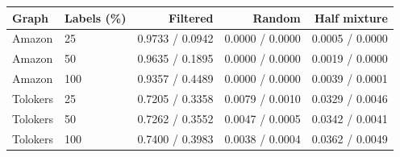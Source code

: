 \begin{tabular}{llrrr}\toprule
Graph & Labels (\%) & Filtered & Random & Half mixture\\\midrule
Amazon & 25 & 0.9733 / 0.0942 & 0.0000 / 0.0000 & 0.0005 / 0.0000 \\
Amazon & 50 & 0.9635 / 0.1895 & 0.0000 / 0.0000 & 0.0019 / 0.0000 \\
Amazon & 100 & 0.9357 / 0.4489 & 0.0000 / 0.0000 & 0.0039 / 0.0001 \\
Tolokers & 25 & 0.7205 / 0.3358 & 0.0079 / 0.0010 & 0.0329 / 0.0046 \\
Tolokers & 50 & 0.7262 / 0.3552 & 0.0047 / 0.0005 & 0.0342 / 0.0041 \\
Tolokers & 100 & 0.7400 / 0.3983 & 0.0038 / 0.0004 & 0.0362 / 0.0049 \\
\bottomrule\end{tabular}
